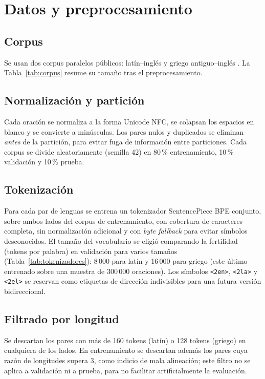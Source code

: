 \documentclass[conference]{IEEEtran}
\begin{document}
\section{Datos y preprocesamiento}

\subsection{Corpus}
Se usan dos corpus paralelos públicos: latín--inglés
\cite{dataset_latin} y griego antiguo--inglés \cite{dataset_griego}. La
Tabla~\ref{tab:corpus} resume su tamaño tras el preprocesamiento.

\subsection{Normalización y partición}
Cada oración se normaliza a la forma Unicode NFC, se colapsan los espacios
en blanco y se convierte a minúsculas. Los pares nulos y duplicados se
eliminan \emph{antes} de la partición, para evitar fuga de información
entre particiones. Cada corpus se divide aleatoriamente (semilla 42) en
80\,\% entrenamiento, 10\,\% validación y 10\,\% prueba.

\subsection{Tokenización}
Para cada par de lenguas se entrena un tokenizador SentencePiece BPE
conjunto, sobre ambos lados del corpus de entrenamiento, con cobertura de
caracteres completa, sin normalización adicional y con \emph{byte
fallback} para evitar símbolos desconocidos. El tamaño del vocabulario se
eligió comparando la fertilidad (tokens por palabra) en validación para
varios tamaños (Tabla~\ref{tab:tokenizadores}): 8\,000 para latín y
16\,000 para griego (este último entrenado sobre una muestra de 300\,000
oraciones). Los símbolos \texttt{<2en>}, \texttt{<2la>} y \texttt{<2el>}
se reservan como etiquetas de dirección indivisibles para una futura
versión bidireccional.

\subsection{Filtrado por longitud}
Se descartan los pares con más de 160 tokens (latín) o 128 tokens
(griego) en cualquiera de los lados. En entrenamiento se descartan además
los pares cuya razón de longitudes supera 3, como indicio de mala
alineación; este filtro no se aplica a validación ni a prueba, para no
facilitar artificialmente la evaluación.
\end{document}
